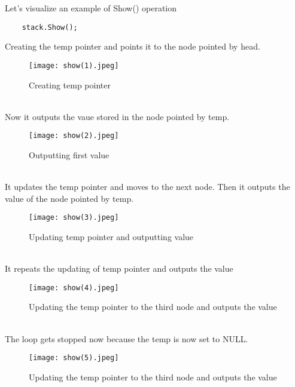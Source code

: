 \documentclass[11pt,fleqn]{book} %
\begin{document}
Let's visualize an example of Show() operation
\begin{example}
	\begin{lstlisting}
	stack.Show();
	\end{lstlisting}
Creating the temp pointer and points it to the node pointed by head.
\begin{figure}[H]
	\centering
	\texttt{[image: show(1).jpeg]}
	\caption{Creating temp pointer}
\end{figure} ~\\
Now it outputs the vaue stored in the node pointed by temp.
\begin{figure}[H]
	\centering
	\texttt{[image: show(2).jpeg]}
	\caption{Outputting first value}
\end{figure} ~\\
It updates the temp pointer and moves to the next node. Then it outputs the value of the node pointed by temp.
\begin{figure}[H]
	\centering
	\texttt{[image: show(3).jpeg]}
	\caption{Updating temp pointer and outputting value}
\end{figure} ~\\
It repeats the updating of temp pointer and outputs the value
\begin{figure}[H]
	\centering
	\texttt{[image: show(4).jpeg]}
	\caption{Updating the temp pointer to the third node and outputs the value}
\end{figure} ~\\
The loop gets stopped now because the temp is now set to NULL.
\begin{figure}[H]
	\centering
	\texttt{[image: show(5).jpeg]}
	\caption{Updating the temp pointer to the third node and outputs the value}
\end{figure}
\end{example}
\end{document}
